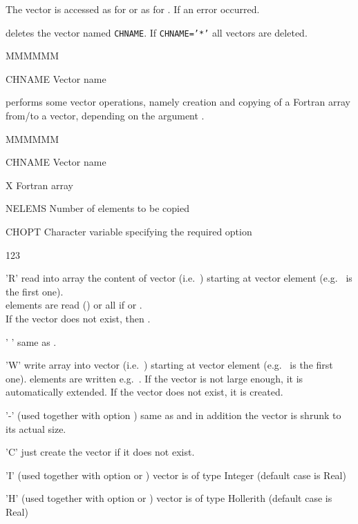 The vector is accessed as  for 
or as  for .
If  an error occurred.

\Action deletes the \KUIP{} vector named {\tt CHNAME}.
If {\tt CHNAME='*'} all vectors are deleted.
\Pdesc\begin{DLtt}{MMMMMM}
\item[CHNAME] Vector name
\end{DLtt}

\Action performs some vector operations,
namely creation and copying of a Fortran array from/to a \KUIP{} vector,
depending on the argument .

\Pdesc\begin{DLtt}{MMMMMM}
\item[CHNAME] Vector name
\item[X] Fortran array
\item[NELEMS] Number of elements to be copied
\item[CHOPT] Character variable specifying the required option
\begin{DLtt}{123}
\item['R'] read into array  the content of vector 
           (i.e.\ )
          starting at vector element 
          (e.g.\  is the first one).\\
           elements are read ()
          or all if  or .\\
          If the vector does not exist, then .
\item[' '] same as .
\item['W'] write array  into vector  
          (i.e.\ )
          starting at vector element 
          (e.g.\  is the first one).
           elements are written e.g.\ .
          If the vector is not large enough, it is automatically extended.
          If the vector does not exist, it is created.
\item['-'] (used together with option ) same as  and in addition
          the vector is shrunk to its actual size.
\item['C'] just create the vector if it does not exist.
\item['I'] (used together with option  or ) vector is of type Integer
          (default case is Real)
\item['H'] (used together with option  or ) vector is of type Hollerith
          (default case is Real)
\end{DLtt}
\end{DLtt}

